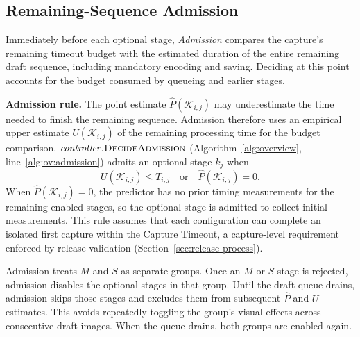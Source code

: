 \subsection{Remaining-Sequence Admission}
\label{sec:admission}

Immediately before each optional stage, \emph{Admission} compares the capture's remaining timeout budget with the estimated duration of the entire remaining draft sequence, including mandatory encoding and saving.
Deciding at this point accounts for the budget consumed by queueing and earlier stages.

\smallskip\noindent\textbf{Admission rule.}
The point estimate \(\hat P(\mathcal K_{i,j})\) may underestimate the time needed to finish the remaining sequence.
Admission therefore uses an empirical upper estimate \(U(\mathcal K_{i,j})\) of the remaining processing time for the budget comparison.
\(\mathit{controller}.\textsc{DecideAdmission}\) (Algorithm~\ref{alg:overview}, line~\ref{alg:ov:admission}) admits an optional stage \(k_j\) when
\begin{equation*}
  U(\mathcal{K}_{i,j})\leq T_{i,j}
  \quad\text{or}\quad
  \hat P(\mathcal{K}_{i,j})=0.
\end{equation*}
When \(\hat P(\mathcal K_{i,j})=0\), the predictor has no prior timing measurements for the remaining enabled stages, so the optional stage is admitted to collect initial measurements.
This rule assumes that each configuration can complete an isolated first capture within the Capture Timeout, a capture-level requirement enforced by release validation (Section~\ref{sec:release-process}).

Admission treats \(M\) and \(S\) as separate groups.
Once an \(M\) or \(S\) stage is rejected, admission disables the optional stages in that group.
Until the draft queue drains, admission skips those stages and excludes them from subsequent \(\hat P\) and \(U\) estimates.
This avoids repeatedly toggling the group's visual effects across consecutive draft images.
When the queue drains, both groups are enabled again.


